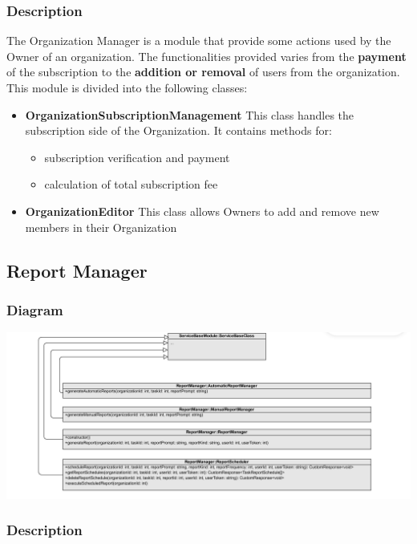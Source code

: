 \documentclass{article}
\begin{document}
\subsubsection{Description}
The Organization Manager is a module that provide some actions used by the Owner of an organization.
The functionalities provided varies from the \textbf{payment} of the subscription to the \textbf{addition or removal} of users from the organization.
This module is divided into the following classes:
\begin{itemize}
    \item \textbf{OrganizationSubscriptionManagement}
    This class handles the subscription side of the Organization. It contains methods for:
    \begin{itemize}
        \item subscription verification and payment
        \item calculation of total subscription fee
    \end{itemize}
    \item \textbf{OrganizationEditor}
    This class allows Owners to add and remove new members in their Organization
\end{itemize}%
\subsection{Report Manager} %

\subsubsection{Diagram}

\includegraphics[width=\textwidth,height=\textheight,keepaspectratio]{images/class_diagram/reportManager.jpg}

\subsubsection{Description}
\end{document}
